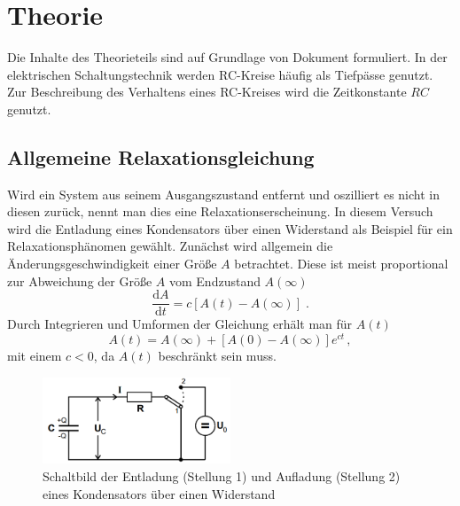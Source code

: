 \section{Theorie}
\label{sec:Theorie}
Die Inhalte des Theorieteils sind auf Grundlage von Dokument \cite{V353} formuliert.
In der elektrischen Schaltungstechnik werden RC-Kreise häufig als Tiefpässe genutzt. 
Zur Beschreibung des Verhaltens eines RC-Kreises wird die Zeitkonstante $RC$ genutzt.
\subsection{Allgemeine Relaxationsgleichung}
Wird ein System aus seinem Ausgangszustand entfernt und oszilliert es nicht in diesen zurück, nennt man dies eine Relaxationserscheinung.
In diesem Versuch wird die Entladung eines Kondensators über einen Widerstand als Beispiel für ein Relaxationsphänomen gewählt.
Zunächst wird allgemein die Änderungsgeschwindigkeit einer Größe $A$ betrachtet. Diese ist meist proportional zur Abweichung der Größe $A$ vom Endzustand $A(\infty)$
\begin{equation*}
    \frac{\text{d}A}{\text{d}t}=c[A(t)-A(\infty)] \; \text{.}
\end{equation*}
Durch Integrieren und Umformen der Gleichung erhält man für $A(t)$
\begin{equation}
    A(t)=A(\infty)+[A(0)-A(\infty)]e^{ct} \, ,
\end{equation}
mit einem $c<0$, da $A(t)$ beschränkt sein muss.
\begin{figure}
    \centering
    \caption{Schaltbild der Entladung (Stellung 1) und Aufladung (Stellung 2) eines Kondensators über einen Widerstand} 
    \label{fig:auf-ent}
    \includegraphics[width = 0.5\textwidth]{pics/auf-ent.png}
\end{figure}
